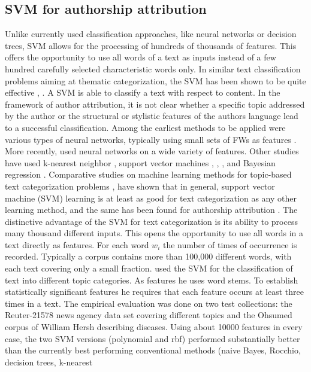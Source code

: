 \subsection{SVM for authorship attribution}
Unlike currently used
classification approaches, like neural networks or decision trees, SVM allows for the processing of hundreds of thousands of features. This offers the opportunity to use all words of a text as inputs instead of a few hundred carefully selected characteristic words only. In similar text classification problems aiming at thematic categorization, the SVM has been shown to be quite effective \cite{joachims1998making}, \cite{dumais1998inductive}.
A SVM is able to classify a text with respect to content. In the framework of author attribution, it is not clear whether a specific topic addressed by the author or the structural or stylistic features of the authors language lead to a successful classification.
Among the earliest methods to be applied were various types of neural networks, typically using small sets of FWs as features \cite{holmes1995forensic}.
More recently, \citeauthor{hirst2007bigrams} used neural networks on a wide variety of features. Other studies have used k-nearest neighbor \cite{zhao2005effective}, support vector machines \cite{diederich2003authorship}, \cite{koppel2005determining}, \cite{zheng2006framework}, and Bayesian regression \cite{madigan2005author}.
Comparative studies on machine learning methods for topic-based text categorization problems \citeauthor{dumais1998inductive}, \citeauthor{joachims1998making} have shown that in general, support vector machine (SVM) learning is at least as good for text categorization as any other
learning method, and the same has been found for authorship attribution \cite{zheng2006framework}.
The distinctive advantage of the SVM for text categorization is its ability to process many thousand different inputs. This opens the opportunity to use all words
in a text directly as features. For each word $w_i$ the number of times of occurrence is recorded. Typically a corpus contains more than 100,000 different words,
with each text covering only a small fraction.
\citeauthor{joachims1998making} \cite{joachims1998making} used the SVM for the classification of text into different topic categories. As features he uses word stems. To establish statistically significant features he requires that each feature occurs at least three times in a text. The empirical evaluation was done
on two test collections: the Reuter-21578 news agency
data set covering different topics and the Ohsumed corpus of William Hersh describing diseases. Using about 10000 features in every case, the two SVM versions (polynomial and rbf) performed substantially better than the currently best performing conventional methods (naive Bayes, Rocchio, decision trees, k-nearest
